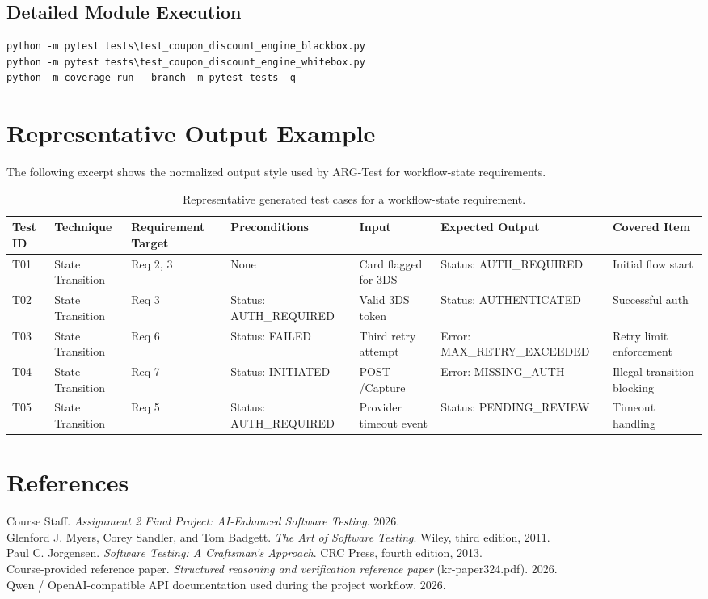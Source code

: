 \documentclass{article}
\renewcommand{\texttt}[1]{{\normalfont #1}}
\begin{document}
\subsection{Detailed Module Execution}
\begin{verbatim}
python -m pytest tests\test_coupon_discount_engine_blackbox.py
python -m pytest tests\test_coupon_discount_engine_whitebox.py
python -m coverage run --branch -m pytest tests -q
\end{verbatim}

\section{Representative Output Example}
The following excerpt shows the normalized output style used by ARG-Test for workflow-state requirements.

\begin{table}[h]
\centering
\tiny
\setlength{\tabcolsep}{2pt}
\caption{Representative generated test cases for a workflow-state requirement.}
\label{tab:outputexample}
\begin{tabular}{p{} p{} p{} p{} p{} p{} p{}}
\toprule
\textbf{Test ID} & \textbf{Technique} & \textbf{Requirement Target} & \textbf{Preconditions} & \textbf{Input} & \textbf{Expected Output} & \textbf{Covered Item} \\
\midrule
T01 & State Transition & Req 2, 3 & None & Card flagged for 3DS & Status: AUTH\_REQUIRED & Initial flow start \\
T02 & State Transition & Req 3 & Status: AUTH\_REQUIRED & Valid 3DS token & Status: AUTHENTICATED & Successful auth \\
T03 & State Transition & Req 6 & Status: FAILED & Third retry attempt & Error: MAX\_RETRY\_EXCEEDED & Retry limit enforcement \\
T04 & State Transition & Req 7 & Status: INITIATED & POST /Capture & Error: MISSING\_AUTH & Illegal transition blocking \\
T05 & State Transition & Req 5 & Status: AUTH\_REQUIRED & Provider timeout event & Status: PENDING\_REVIEW & Timeout handling \\
\bottomrule
\end{tabular}
\end{table}

\section*{References}
\noindent [1] Course Staff. \emph{Assignment 2 Final Project: AI-Enhanced Software Testing}. 2026.\\
\noindent [2] Glenford J. Myers, Corey Sandler, and Tom Badgett. \emph{The Art of Software Testing}. Wiley, third edition, 2011.\\
\noindent [3] Paul C. Jorgensen. \emph{Software Testing: A Craftsman's Approach}. CRC Press, fourth edition, 2013.\\
\noindent [4] Course-provided reference paper. \emph{Structured reasoning and verification reference paper} (\texttt{kr-paper324.pdf}). 2026.\\
\noindent [5] Qwen / OpenAI-compatible API documentation used during the project workflow. 2026.
\end{document}
